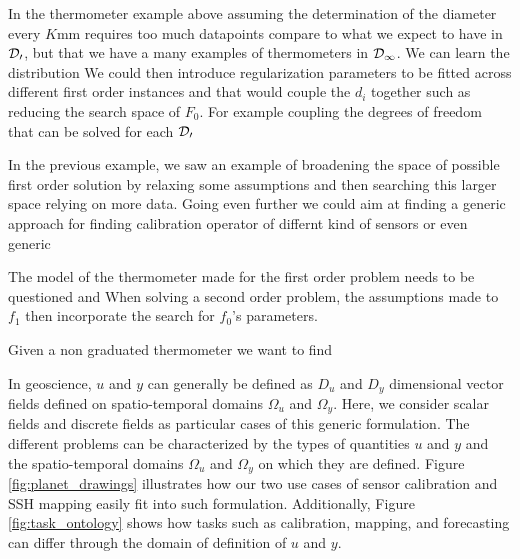 \begin{bibunit}
{{{{{{  In the thermometer example above assuming the determination of the diameter every $K$mm requires too much datapoints compare to what we expect to have in $\cal{D}_0$, but that we have a many examples of thermometers in $\cal{D}_1$.
  We can learn the distribution 
  We could then introduce regularization parameters to be fitted across different first order instances and that would couple the $d_i$ together such as reducing the search space of $F_0$.
  For example coupling the 
  degrees of freedom that can be solved for each $\cal{D}_0$


In the previous example, we saw an example of broadening the space of possible first order solution by relaxing some assumptions and then searching this larger space relying on more data.
Going even further we could aim at finding a generic approach for finding calibration operator of differnt kind of sensors or even generic 




  The model of the thermometer made for the first order problem needs to be questioned and 
  When solving a second order problem, the assumptions made to 
  $f_1$ then incorporate the search for $f_0$'s parameters.



Given a non graduated thermometer we want to find 


In geoscience, $u$ and $y$ can generally be defined as $D_u$ and $D_y$ dimensional vector fields defined on spatio-temporal domains $\Omega_u$ and $\Omega_y$. Here, we consider scalar fields and discrete fields as particular cases of this generic formulation. The different problems can be characterized by the types of quantities $u$ and $y$ and the spatio-temporal domains $\Omega_u$ and $\Omega_y$ on which they are defined. Figure \ref{fig:planet_drawings} illustrates how our two use cases of sensor calibration and SSH mapping easily fit into such formulation. Additionally, Figure \ref{fig:task_ontology} shows how tasks such as calibration, mapping, and forecasting can differ through the domain of definition of $u$ and $y$.

}}}}}}
\end{bibunit}
